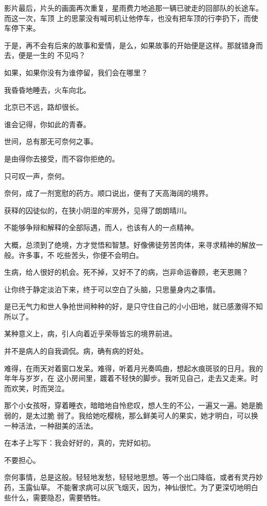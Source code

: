 		影片最后，片头的画面再次重复，星雨费力地追那一辆已驶走的回部队的长途车。而这一次，车顶
	上的思蒙没有喊司机让他停车，也没有把车顶的行李扔下，而使车停下来。

		于是，再不会有后来的故事和爱情，是么，如果故事的开始便是这样。那就错身而去，便是一生的
	不见吗？

		如果，如果你没有为谁停留，我们会在哪里？

		我昏昏地睡去，火车向北。

		北京已不远，路却很长。

		谁会记得，你如此的青春。

	\endwriting



		世间，总有那无可奈何之事。

		是由得你去接受，而不容你拒绝的。

		只可叹一声，奈何。

		奈何，成了一剂宽慰的药方。顺口说出，便有了天高海阔的境界。

		获释的囚徒似的，在狭小阴湿的牢房外，见得了朗朗晴川。

		不能够争辩和解释的全部际遇，而人，也该有人的一点精神。

		大概，总须到了绝境，方才觉悟和智慧。好像佛徒劳苦肉体，来寻求精神的解放一般。许多事，不
	吃些苦头，你便不会明白。

		生病，给人很好的机会。死不掉，又好不了的病，岂非命运眷顾，老天恩赐？

		让你终于静定淡泊下来，终于可以空白了头脑，只思量身内之事情。

		是已无气力和世人争抢世间种种的好，是只守住自己的小小田地，就已感激得不知所以了。

		某种意义上，病，引人向着近乎荣辱皆忘的境界前进。

		并不是病人的自我调侃。病，确有病的好处。

		难得，在雨天对着窗口发呆。难得，听着月光奏鸣曲，想起水痕斑驳的日月。我的年年与岁岁，在
	这小房间里，踱着不轻快的脚步。我听见自己，走去又走来。时而欢笑，时而哭泣。

		那个小女孩呀，穿着睡衣，暗暗地自怜悲叹，想人生的不公，一遍又一遍。她是脆弱的，是太过脆
	弱了。我给她吃樱桃，那么鲜美可人的果实，她才明白，可以换一种活法，一种甜美的活法。

		在本子上写下：我会好好的，真的，完好如初。

		不要担心。

		奈何事情，总是这般。轻轻地发愁，轻轻地思想。等一个出口降临，或者有灵丹妙药，玉露仙草。
	不能奢求病可以灰飞烟灭，因为，神仙很忙。为了更深切地明白些什么，需要隐忍，需要牺牲。


